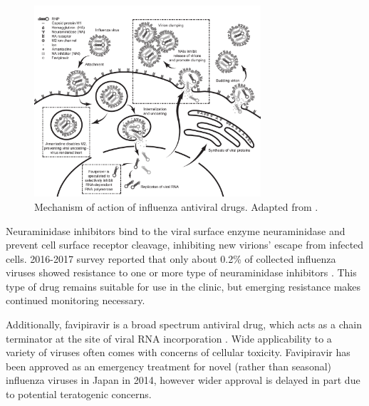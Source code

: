 \begin{figure}
\begin{center}
\includegraphics[width=0.75\textwidth, trim={0cm 0cm 0cm 0cm}, clip]{D_chapters/0_introduction/flu_drug.pdf}
\caption[Mechanism of action of influenza antiviral drugs]{Mechanism of action of influenza antiviral drugs. Adapted from \cite{stiver2003treatment}.}
\label{figure:fluDrugs}
\end{center}
\end{figure}

Neuraminidase inhibitors bind to the viral surface enzyme neuraminidase and prevent cell surface receptor cleavage, inhibiting new virions' escape from infected cells. 2016-2017 survey reported that only about 0.2\% of collected influenza viruses showed resistance to one or more type of neuraminidase inhibitors \cite{lackenby2018global}. This type of drug remains suitable for use in the clinic, but emerging resistance makes continued monitoring necessary.

Additionally, favipiravir is a broad spectrum antiviral drug, which acts as a chain terminator at the site of viral RNA incorporation \cite{shiraki2020favipiravir}. Wide applicability to a variety of viruses often comes with concerns of cellular toxicity. Favipiravir has been approved as an emergency treatment for novel (rather than seasonal) influenza viruses in Japan in 2014, however wider approval is delayed in part due to potential teratogenic concerns.
